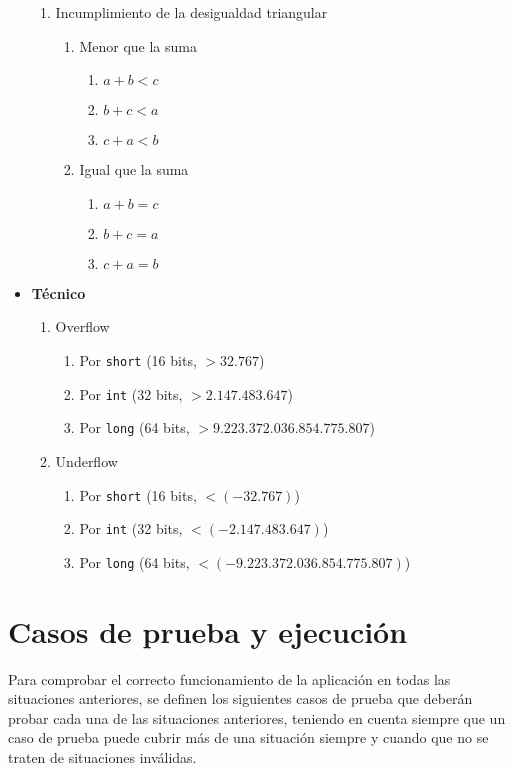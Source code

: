 \begin{itemize}
\begin{enumerate}[label=L\arabic*.]
			\item Incumplimiento de la desigualdad triangular
				\begin{enumerate}[label=L2.\arabic*.]
					\item Menor que la suma
						\begin{enumerate}[label=L2.1.\arabic*.]
							\item $a + b < c$
							\item $b + c < a$
							\item $c + a < b$
						\end{enumerate}
					\item Igual que la suma
						\begin{enumerate}[label=L2.2.\arabic*.]
							\item $a + b = c$
							\item $b + c = a$
							\item $c + a = b$
						\end{enumerate}
				\end{enumerate}
		\end{enumerate}
	\item \textbf{Técnico}
		\begin{enumerate}[label=T\arabic*.]
			\item Overflow
				\begin{enumerate}[label=T1.\arabic*.]
					\item Por \Verb#short# (16 bits, $>32.767$)
					\item Por \Verb#int# (32 bits, $>2.147.483.647$)
					\item Por \Verb#long# (64 bits, $>9.223.372.036.854.775.807$)
				\end{enumerate}
			\item Underflow
				\begin{enumerate}[label=T2.\arabic*.]
					\item Por \Verb#short# (16 bits, $<(-32.767)$)
					\item Por \Verb#int# (32 bits, $<(-2.147.483.647)$)
					\item Por \Verb#long# (64 bits, $<(-9.223.372.036.854.775.807)$)
				\end{enumerate}
		\end{enumerate}
\end{itemize}
\newpage{}
\section{Casos de prueba y ejecución}
Para comprobar el correcto funcionamiento de la aplicación en todas las
situaciones anteriores, se definen los siguientes casos de prueba que
deberán probar cada una de las situaciones anteriores, teniendo en cuenta
siempre que un caso de prueba puede cubrir más de una situación siempre y
cuando que no se traten de situaciones inválidas.

